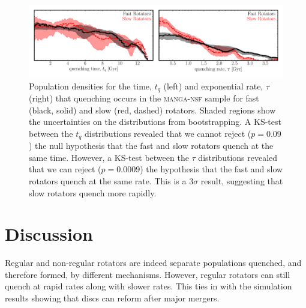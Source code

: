 \documentclass[useAMS,usenatbib]{mn2e}
\begin{document}
\begin{figure}
\centering
\includegraphics[width=\textwidth]{../figures/quenching_time_rate_FR_SR_NSF_C16.pdf}
\caption{Population densities for the time, $t_q$ (left) and exponential rate, $\tau$ (right) that quenching occurs in the \textsc{manga-nsf} sample for fast (black, solid) and slow (red, dashed) rotators. Shaded regions show the uncertainties on the distributions from bootstrapping. A KS-test between the $t_q$ distributions revealed that we cannot reject ($p=0.09$) the null hypothesis that the fast and slow rotators quench at the same time. However, a KS-test between the $\tau$ distributions revealed that we can reject ($p=0.0009$) the hypothesis that the fast and slow rotators quench at the same rate. This is a $3\sigma$ result, suggesting that slow rotators quench more rapidly.}
\label{fig:popfrvsr}
\end{figure}

\section{Discussion}\label{sec:discussion}

Regular and non-regular rotators are indeed separate populations quenched, and therefore formed, by different mechanisms. However, regular rotators can still quench at rapid rates along with slower rates. This ties in with the simulation results showing that discs can reform after major mergers. 


  
\end{document}
